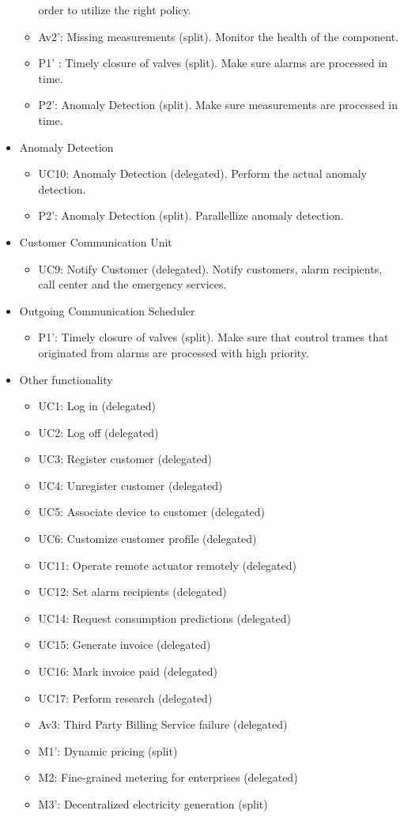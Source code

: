 \begin{itemize}
\begin{itemize}
		order to utilize the right policy.
		\item Av2': Missing measurements (split). Monitor the health of the
	  	component.
		\item P1' : Timely closure of valves (split). Make sure alarms are processed
		in time. 
	  	\item P2': Anomaly Detection (split). Make sure measurements are processed
	  	in time. 
	\end{itemize}
	\item Anomaly Detection
	\begin{itemize}
		\item UC10: Anomaly Detection (delegated). Perform the actual anomaly
		detection.
		\item P2': Anomaly Detection (split). Parallellize anomaly detection.
	\end{itemize}
	\item Customer Communication Unit
	\begin{itemize}
		\item UC9: Notify Customer (delegated). Notify customers, alarm recipients,
		call center and the emergency services. 
	\end{itemize}
	\item Outgoing Communication Scheduler
	\begin{itemize}
	  \item P1': Timely closure of valves (split). Make sure that control trames
	  that originated from alarms are processed with high priority. 
	\end{itemize}
	\item Other functionality
	\begin{itemize}
	  	\item UC1: Log in (delegated)
	  	\item UC2: Log off (delegated)
	  	\item UC3: Register customer (delegated)
	  	\item UC4: Unregister customer (delegated)
	  	\item UC5: Associate device to customer (delegated)
	  	\item UC6: Customize customer profile (delegated)
	  	\item UC11: Operate remote actuator remotely (delegated)
	  	\item UC12: Set alarm recipients (delegated)
	  	\item UC14: Request consumption predictions (delegated)
	  	\item UC15: Generate invoice (delegated)
	  	\item UC16: Mark invoice paid (delegated)
	  	\item UC17: Perform research (delegated)
	  	\item Av3: Third Party Billing Service failure (delegated)
	  	\item M1': Dynamic pricing (split)
	  	\item M2: Fine-grained metering for enterprises (delegated)
	  	\item M3': Decentralized electricity generation (split)
	\end{itemize}
\end{itemize}
